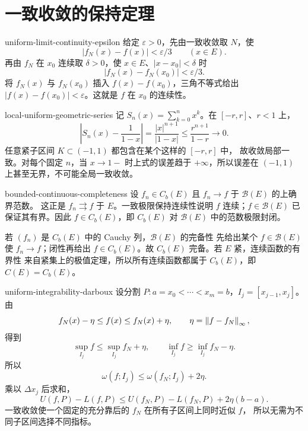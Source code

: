 \chapter{一致收敛的保持定理}
\label{chap:uniform-convergence-preservation-solutions}

\begin{solution}{uniform-limit-continuity-epsilon}
给定 \(\varepsilon>0\)，先由一致收敛取 \(N\)，使
\[
 |f_N(x)-f(x)|<\varepsilon/3\qquad(x\in E).
\]
再由 \(f_N\) 在 \(x_0\) 连续取 \(\delta>0\)，使
\(x\in E\)、\(|x-x_0|<\delta\) 时
\[
 |f_N(x)-f_N(x_0)|<\varepsilon/3.
\]
将 \(f_N(x)\) 与 \(f_N(x_0)\) 插入 \(f(x)-f(x_0)\)，三角不等式给出
\(|f(x)-f(x_0)|<\varepsilon\)。这就是 \(f\) 在 \(x_0\) 的连续性。
\end{solution}

\begin{solution}{local-uniform-geometric-series}
记 \(S_n(x)=\sum_{k=0}^nx^k\)。在 \([-r,r]\)、\(r<1\) 上，
\[
 \left|S_n(x)-\frac1{1-x}\right|
 =\frac{|x|^{n+1}}{|1-x|}
 \le\frac{r^{n+1}}{1-r}\to0.
\]
任意紧子区间 \(K\subset(-1,1)\) 都包含在某个这样的 \([-r,r]\) 中，
故收敛局部一致。对每个固定 \(n\)，当 \(x\to1-\) 时上式的误差趋于
\(+\infty\)，所以误差在 \((-1,1)\) 上甚至无界，不可能全局一致收敛。
\end{solution}

\begin{solution}{bounded-continuous-completeness}
设 \(f_n\in C_b(E)\) 且 \(f_n\to f\) 于 \(\mathcal B(E)\) 的上确界范数。
这正是 \(f_n\rightrightarrows f\) 于 \(E\)。一致极限保持连续性说明
\(f\) 连续；\(f\in\mathcal B(E)\) 已保证其有界。因此
\(f\in C_b(E)\)，即 \(C_b(E)\) 对 \(\mathcal B(E)\) 中的范数极限封闭。

若 \((f_n)\) 是 \(C_b(E)\) 中的 Cauchy 列，\(\mathcal B(E)\) 的完备性
先给出某个 \(f\in\mathcal B(E)\) 使 \(f_n\to f\)；闭性再给出
\(f\in C_b(E)\)。故 \(C_b(E)\) 完备。若 \(E\) 紧，连续函数的有界性
来自紧集上的极值定理，所以所有连续函数都属于 \(C_b(E)\)，即
\(C(E)=C_b(E)\)。
\end{solution}

\begin{solution}{uniform-integrability-darboux}
设分割 \(P:a=x_0<\cdots<x_m=b\)，\(I_j=[x_{j-1},x_j]\)。由
\[
 f_N(x)-\eta\le f(x)\le f_N(x)+\eta,\qquad
 \eta=\left\lVert f-f_N\right\rVert_\infty,
\]
得到
\[
 \sup_{I_j}f\le\sup_{I_j}f_N+\eta,\qquad
 \inf_{I_j}f\ge\inf_{I_j}f_N-\eta.
\]
所以
\[
 \omega(f;I_j)\le\omega(f_N;I_j)+2\eta.
\]
乘以 \(\Delta x_j\) 后求和，
\[
 U(f,P)-L(f,P)
 \le U(f_N,P)-L(f_N,P)+2\eta(b-a).
\]
一致收敛使一个固定的充分靠后的 \(f_N\) 在所有子区间上同时近似 \(f\)，
所以无需为不同子区间选择不同指标。
\end{solution}

